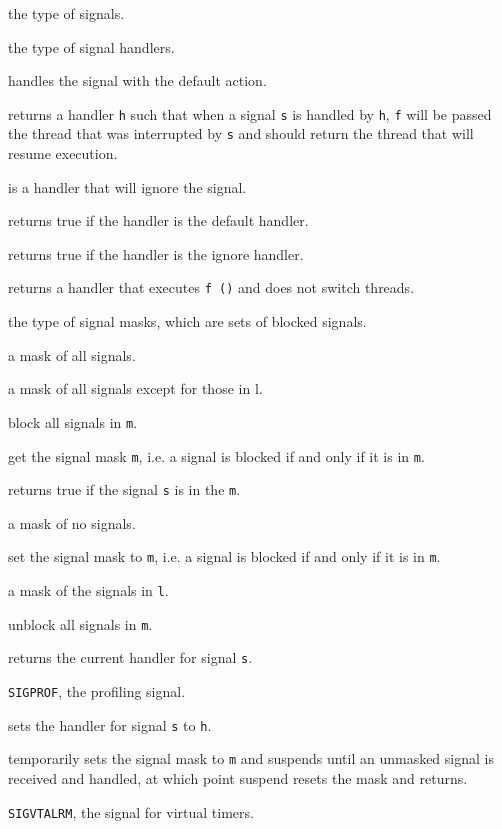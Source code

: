 \begin{description}

 the type of signals.

the type of signal handlers.

handles the signal with the default action.

returns a handler {\tt h} such that when a signal {\tt s} is handled
by {\tt h}, {\tt f} will be passed the thread that was interrupted by
{\tt s} and should return the thread that will resume execution.

is a handler that will ignore the signal.

returns true if the handler is the default handler.

returns true if the handler is the ignore handler.

returns a handler that executes {\tt f ()} and does not switch
threads.

the type of signal masks, which are sets of blocked signals.

a mask of all signals.

a mask of all signals except for those in l.

block all signals in {\tt m}.

get the signal mask {\tt m}, i.e. a signal is blocked if and only
if it is in {\tt m}.

returns true if the signal {\tt s} is in the {\tt m}.

a mask of no signals.

set the signal mask to {\tt m}, i.e. a signal is blocked if and only
if it is in {\tt m}.

 a mask of the signals in {\tt l}.

 unblock all signals in {\tt m}.

returns the current handler for signal {\tt s}.

{\tt SIGPROF}, the profiling signal.

sets the handler for signal {\tt s} to {\tt h}.

temporarily sets the signal mask to {\tt m} and suspends until an
unmasked signal is received and handled, at which point suspend resets
the mask and returns.

{\tt SIGVTALRM}, the signal for virtual timers.
\end{description}
%
